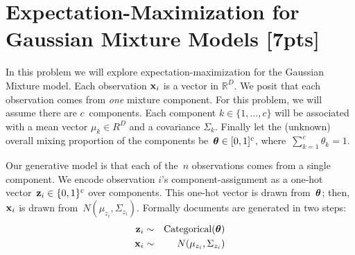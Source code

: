 \documentclass[submit]{harvardml}
\begin{document}
\section*{Expectation-Maximization for Gaussian Mixture Models [7pts]}


In this problem we will explore expectation-maximization for the
Gaussian Mixture model.  Each observation $\mathbf{x}_i$ is a vector in
$\mathbb{R}^{D}$.  We posit that each observation comes from
\emph{one} mixture component.  For this problem, we will assume there
are $c$~components. Each component $k \in \{1, \ldots, c\}$ will be
associated with a mean vector $\mu_k \in R^{D}$ and a covariance
$\Sigma_k$.  Finally let the (unknown) overall mixing proportion of
the components be~$\boldsymbol{\theta} \in [0,1]^c$, where~${\sum_{k=1}^c
  \theta_k=1}$.

Our generative model is that each of the~$n$ observations comes from a
single component.  We encode observation $i$'s component-assignment as
a one-hot vector~${\mathbf{z}_i \in \{0,1\}^c}$ over components. This
one-hot vector is drawn from~$\boldsymbol{\theta}$; then, $\mathbf{x}_i$ is drawn
from~$N(\mu_{z_i}, \Sigma_{z_i})$. Formally documents are generated in two steps:
\begin{eqnarray*}
 \mathbf{z}_i &\sim& \text{Categorical}(\boldsymbol{\theta}) \\
 \mathbf{x}_i &\sim& N(\mu_{z_i}, \Sigma_{z_i})
\end{eqnarray*}
\end{document}

